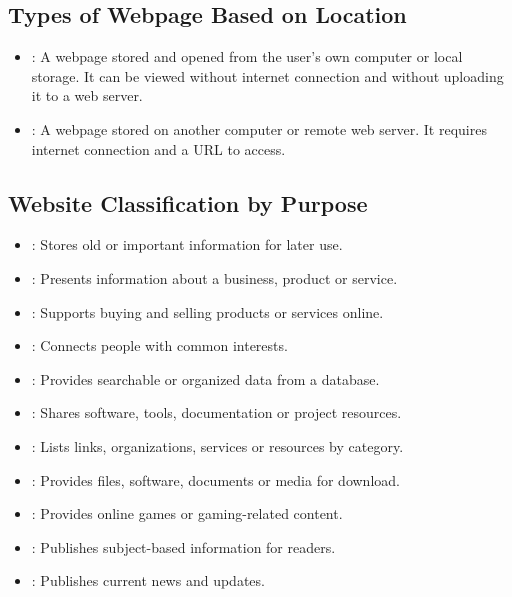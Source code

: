 \subsection{Types of Webpage Based on Location}

\begin{itemize}
    \item {}: A webpage stored and opened from the user's own computer or local storage. It can be viewed without internet connection and without uploading it to a web server.
    
    \item {}: A webpage stored on another computer or remote web server. It requires internet connection and a URL to access.
\end{itemize}


\subsection{Website Classification by Purpose}

\begin{itemize}
    \item {}: Stores old or important information for later use.
    \item {}: Presents information about a business, product or service.
    \item {}: Supports buying and selling products or services online.
    \item {}: Connects people with common interests.
    \item {}: Provides searchable or organized data from a database.
    \item {}: Shares software, tools, documentation or project resources.
    \item {}: Lists links, organizations, services or resources by category.
    \item {}: Provides files, software, documents or media for download.
    \item {}: Provides online games or gaming-related content.
    \item {}: Publishes subject-based information for readers.
    \item {}: Publishes current news and updates.
\end{itemize}


